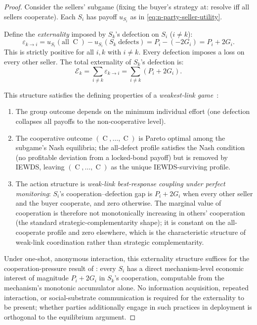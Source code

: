 \documentclass[11pt,a4paper]{article}
\theoremstyle{definition}
\theoremstyle{remark}
\newcommand{\pay}{P}           %
\newcommand{\cumval}{G}        %
\DeclareMathOperator{\Coop}{C}
\begin{document}
\begin{proof}
Consider the sellers' subgame (fixing the buyer's strategy at: resolve
iff all sellers cooperate). Each $S_i$ has payoff
$u_{S_i}$ as in \eqref{eq:n-party-seller-utility}.

Define the \emph{externality} imposed by $S_k$'s defection on $S_i$
($i \neq k$):
\begin{equation}
  \varepsilon_{k \to i}
    = u_{S_i}(\text{all}\;\Coop) - u_{S_i}(S_k\;\text{defects})
    = \pay_i - (-2\cumval_i)
    = \pay_i + 2\cumval_i.
\end{equation}
This is strictly positive for all $i, k$ with $i \neq k$. Every
defection imposes a loss on every other seller. The total externality
of $S_k$'s defection is:
\begin{equation}
  \mathcal{E}_k = \sum_{i \neq k} \varepsilon_{k \to i}
    = \sum_{i \neq k} (\pay_i + 2\cumval_i).
\end{equation}

This structure satisfies the defining properties of a \emph{weakest-link
game}~\citep{hirshleifer1983}:
\begin{enumerate}
  \item The group outcome depends on the minimum individual effort
    (one defection collapses all payoffs to the non-cooperative level).
  \item The cooperative outcome $(\Coop, \ldots, \Coop)$ is Pareto
    optimal among the subgame's Nash equilibria; the all-defect
    profile satisfies the Nash condition (no profitable deviation
    from a locked-bond payoff) but is removed by IEWDS, leaving
    $(\Coop, \ldots, \Coop)$ as the unique IEWDS-surviving profile.
  \item The action structure is \emph{weak-link best-response
    coupling under perfect monitoring}: $S_i$'s cooperation--defection
    gap is $\pay_i + 2\cumval_i$ when every other seller and the
    buyer cooperate, and zero otherwise. The marginal value of
    cooperation is therefore not monotonically increasing in others'
    cooperation (the standard strategic-complementarity shape); it
    is constant on the all-cooperate profile and zero elsewhere,
    which is the characteristic structure of weak-link coordination
    rather than strategic complementarity.
\end{enumerate}

Under one-shot, anonymous interaction, this externality structure
suffices for the cooperation-pressure result of
: every $S_i$ has a direct
mechanism-level economic interest of magnitude $\pay_i + 2\cumval_i$
in $S_k$'s cooperation, computable from the mechanism's monotonic
accumulator alone. No information acquisition, repeated interaction,
or social-substrate communication is required for the externality
to be present; whether parties additionally engage in such
practices in deployment is orthogonal to the equilibrium argument.
\end{proof}
\end{document}
